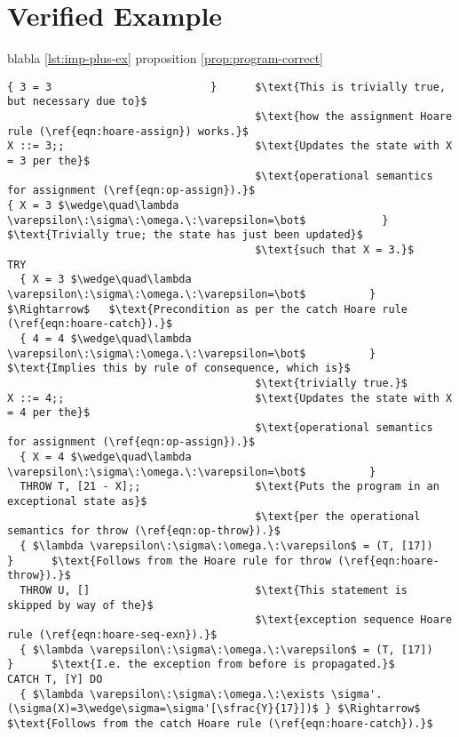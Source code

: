 \section{Verified Example}

blabla \ref{lst:imp-plus-ex} proposition \ref{prop:program-correct}

\begin{lstlisting}[mathescape=true,keepspaces=true,label=lst:hoare_ex_asgn,caption=A small program demonstrating a try-catch statement.]
{ 3 = 3                         }      $\text{This is trivially true, but necessary due to}$
                                       $\text{how the assignment Hoare rule (\ref{eqn:hoare-assign}) works.}$
X ::= 3;;                              $\text{Updates the state with X = 3 per the}$
                                       $\text{operational semantics for assignment (\ref{eqn:op-assign}).}$
{ X = 3 $\wedge\quad\lambda \varepsilon\:\sigma\:\omega.\:\varepsilon=\bot$            }      $\text{Trivially true; the state has just been updated}$
                                       $\text{such that X = 3.}$
TRY
  { X = 3 $\wedge\quad\lambda \varepsilon\:\sigma\:\omega.\:\varepsilon=\bot$          } $\Rightarrow$   $\text{Precondition as per the catch Hoare rule (\ref{eqn:hoare-catch}).}$
  { 4 = 4 $\wedge\quad\lambda \varepsilon\:\sigma\:\omega.\:\varepsilon=\bot$          }      $\text{Implies this by rule of consequence, which is}$
                                       $\text{trivially true.}$
X ::= 4;;                              $\text{Updates the state with X = 4 per the}$
                                       $\text{operational semantics for assignment (\ref{eqn:op-assign}).}$
  { X = 4 $\wedge\quad\lambda \varepsilon\:\sigma\:\omega.\:\varepsilon=\bot$          }
  THROW T, [21 - X];;                  $\text{Puts the program in an exceptional state as}$
                                       $\text{per the operational semantics for throw (\ref{eqn:op-throw}).}$
  { $\lambda \varepsilon\:\sigma\:\omega.\:\varepsilon$ = (T, [17])          }      $\text{Follows from the Hoare rule for throw (\ref{eqn:hoare-throw}).}$
  THROW U, []                          $\text{This statement is skipped by way of the}$
                                       $\text{exception sequence Hoare rule (\ref{eqn:hoare-seq-exn}).}$
  { $\lambda \varepsilon\:\sigma\:\omega.\:\varepsilon$ = (T, [17])          }      $\text{I.e. the exception from before is propagated.}$
CATCH T, [Y] DO
  { $\lambda \varepsilon\:\sigma\:\omega.\:\exists \sigma'.(\sigma(X)=3\wedge\sigma=\sigma'[\sfrac{Y}{17}])$ } $\Rightarrow$    $\text{Follows from the catch Hoare rule (\ref{eqn:hoare-catch}).}$

\end{lstlisting}
